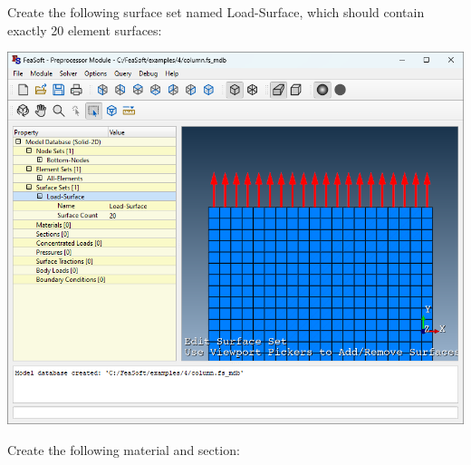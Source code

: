 \documentclass[
    11pt,        %
    a4paper,     %
    final,       %
    fleqn,       %
    notitlepage, %
    onecolumn,   %
    oneside,     %
]{article}
\begin{document}
Create the following surface set named Load-Surface, which should contain exactly 20 element surfaces:
\begin{center}
    \includegraphics[scale=0.5]{fig/ui-4-4.png}
\end{center}

Create the following material and section:
\begin{center}
\end{center}
\end{document}
